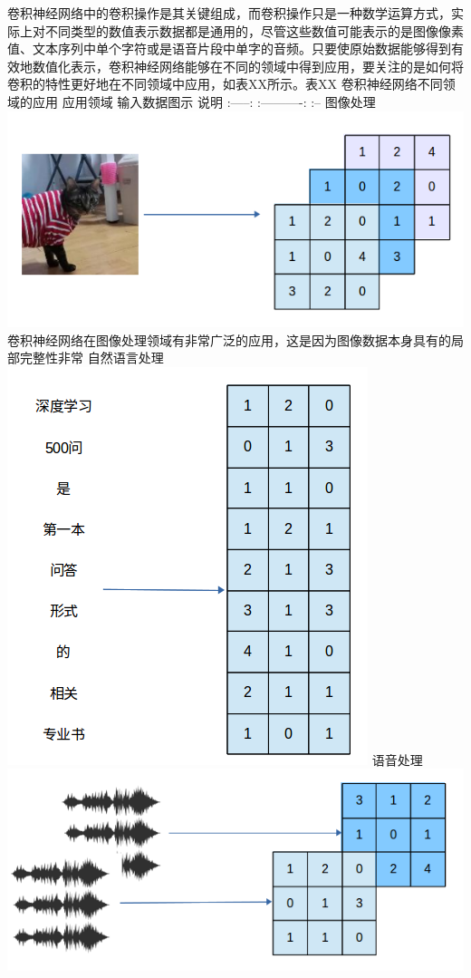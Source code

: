 ​
卷积神经网络中的卷积操作是其关键组成，而卷积操作只是一种数学运算方式，实际上对不同类型的数值表示数据都是通用的，尽管这些数值可能表示的是图像像素值、文本序列中单个字符或是语音片段中单字的音频。只要使原始数据能够得到有效地数值化表示，卷积神经网络能够在不同的领域中得到应用，要关注的是如何将卷积的特性更好地在不同领域中应用，如表XX所示。
​ 表XX 卷积神经网络不同领域的应用 \textbar{} 应用领域 \textbar{}
输入数据图示 \textbar{} 说明 \textbar{} \textbar{} :-----: \textbar{}
:----------: \textbar{} :-- \textbar{} \textbar{} 图像处理 \textbar{}
\includegraphics{img/ch5/Image-process.png} \textbar{}
卷积神经网络在图像处理领域有非常广泛的应用，这是因为图像数据本身具有的局部完整性非常
\textbar{} \textbar{} 自然语言处理 \textbar{}
\includegraphics{img/ch5/NLP.png} \textbar{} \textbar{} \textbar{}
语音处理 \textbar{} \includegraphics{img/ch5/audio-recognition.png}
\textbar{} \textbar{}

